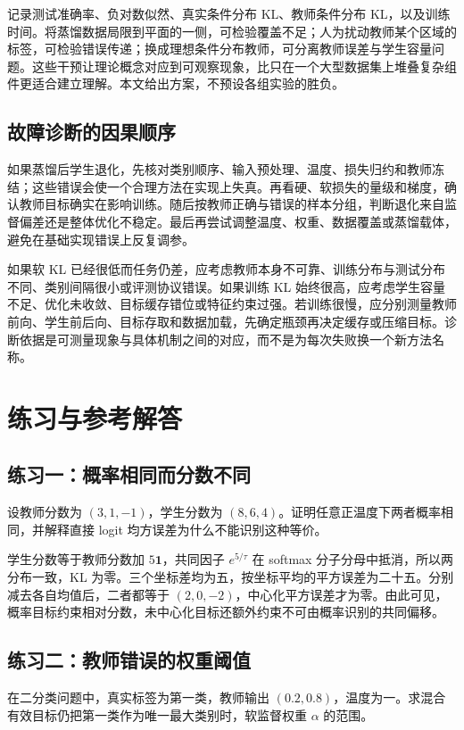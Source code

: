 \documentclass[UTF8,12pt,a4paper,fontset=fandol]{ctexart}
\begin{document}
记录测试准确率、负对数似然、真实条件分布 KL、教师条件分布 KL，以及训练时间。将蒸馏数据局限到平面的一侧，可检验覆盖不足；人为扰动教师某个区域的标签，可检验错误传递；换成理想条件分布教师，可分离教师误差与学生容量问题。这些干预让理论概念对应到可观察现象，比只在一个大型数据集上堆叠复杂组件更适合建立理解。本文给出方案，不预设各组实验的胜负。

\subsection{故障诊断的因果顺序}
如果蒸馏后学生退化，先核对类别顺序、输入预处理、温度、损失归约和教师冻结；这些错误会使一个合理方法在实现上失真。再看硬、软损失的量级和梯度，确认教师目标确实在影响训练。随后按教师正确与错误的样本分组，判断退化来自监督偏差还是整体优化不稳定。最后再尝试调整温度、权重、数据覆盖或蒸馏载体，避免在基础实现错误上反复调参。

如果软 KL 已经很低而任务仍差，应考虑教师本身不可靠、训练分布与测试分布不同、类别间隔很小或评测协议错误。如果训练 KL 始终很高，应考虑学生容量不足、优化未收敛、目标缓存错位或特征约束过强。若训练很慢，应分别测量教师前向、学生前后向、目标存取和数据加载，先确定瓶颈再决定缓存或压缩目标。诊断依据是可测量现象与具体机制之间的对应，而不是为每次失败换一个新方法名称。

\section{练习与参考解答}
\label{sec:kd-exercises}

\subsection{练习一：概率相同而分数不同}
设教师分数为 $(3,1,-1)$，学生分数为 $(8,6,4)$。证明任意正温度下两者概率相同，并解释直接 logit 均方误差为什么不能识别这种等价。

\begin{solve}
学生分数等于教师分数加 $5\mathbf1$，共同因子 $e^{5/\tau}$ 在 softmax 分子分母中抵消，所以两分布一致，KL 为零。三个坐标差均为五，按坐标平均的平方误差为二十五。分别减去各自均值后，二者都等于 $(2,0,-2)$，中心化平方误差才为零。由此可见，概率目标约束相对分数，未中心化目标还额外约束不可由概率识别的共同偏移。
\end{solve}

\subsection{练习二：教师错误的权重阈值}
在二分类问题中，真实标签为第一类，教师输出 $(0.2,0.8)$，温度为一。求混合有效目标仍把第一类作为唯一最大类别时，软监督权重 $\alpha$ 的范围。
\end{document}
